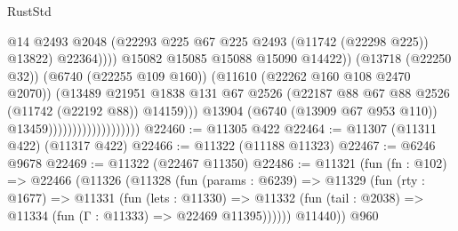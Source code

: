 \begin{lexlean}{RustStd}
\begin{coremodule}
                                                        @14
                                                        @2493
                                                        @2048
                                                        (@22293
                                                          @225
                                                          @67
                                                          @225
                                                          @2493
                                                          (@11742 (@22298 @225))
                                                          @13822)
                                                        @22364))))
                                                @15082
                                                @15085
                                                @15088
                                                @15090
                                                @14422))
                                            (@13718 (@22250 @32))
                                            (@6740 (@22255 @109 @160))
                                            (@11610 (@22262 @160 @108 @2470 @2070))
                                            (@13489
                                              @21951
                                              @1838
                                              @131
                                              @67
                                              @2526
                                              (@22187
                                                @88
                                                @67
                                                @88
                                                @2526
                                                (@11742 (@22192 @88))
                                                @14159)))
                                          @13904
                                          (@6740 (@13909 @67 @953 @110))
                                          @13459)))))))))))))))))))
@22460 := @11305 @422
@22464 := @11307 (@11311 @422) (@11317 @422)
@22466 := @11322 (@11188 @11323)
@22467 := @6246 @9678
@22469 := @11322 (@22467 @11350)
@22486 := @11321
    (fun (fn : @102) =>
    @22466
      (@11326
        (@11328
          (fun (params : @6239) =>
          @11329
            (fun (rty : @1677) =>
            @11331
              (fun (lets : @11330) =>
              @11332 (fun (tail : @2038) => @11334 (fun (Γ : @11333) => @22469 @11395))))))
        @11440))
    @960

\end{coremodule}
\end{lexlean}
